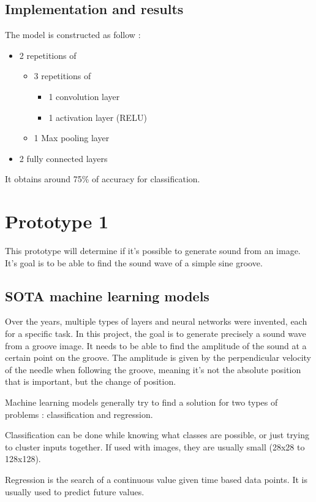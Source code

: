 \documentclass[12pt, twoside]{article}
\begin{document}
\subsection{Implementation and results}
The model is constructed as follow : %
\begin{itemize}
	\item 2 repetitions of
	\begin{itemize}
		\item 3 repetitions of
		\begin{itemize}
			\item 1 convolution layer
			\item 1 activation layer (RELU)
		\end{itemize}
		\item 1 Max pooling layer
	\end{itemize}
	\item 2 fully connected layers	
\end{itemize}
It obtains around 75\% of accuracy for classification. 
\section{Prototype 1}
This prototype will determine if it's possible to generate sound from an image. It's goal is to be able to find the sound wave of a simple sine groove.
\subsection{SOTA machine learning models}
Over the years, multiple types of layers and neural networks were invented, each for a specific task. In this project, the goal is to generate precisely a sound wave from a groove image. It needs to be able to find the amplitude of the sound at a certain point on the groove. The amplitude is given by the perpendicular velocity of the needle when following the groove, meaning it's not the absolute position that is important, but the change of position.

Machine learning models generally try to find a solution for two types of problems : classification and regression.

Classification can be done while knowing what classes are possible, or just trying to cluster inputs together. If used with images, they are usually small (28x28 to 128x128).

Regression is the search of a continuous value given time based data points. It is usually used to predict future values.
\end{document}
